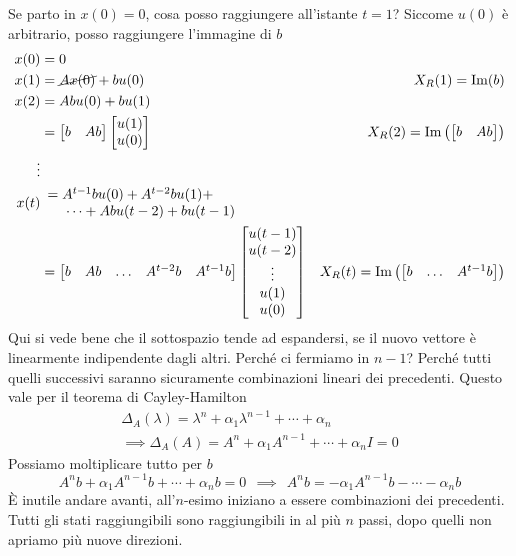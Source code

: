 Se parto in $x(0) =0$, cosa posso raggiungere all'istante $t=1$? Siccome $u(0)$ è arbitrario, posso raggiungere l'immagine di $b$
\begin{equation*}
	\begin{aligned}
		x(0) & =0 & \\
		x(1) & =\cancel{Ax(0)} +bu(0) & X_R(1) =\Im(b)\\
		x(2) & =Abu(0) +bu(1) & \\
		& =\begin{bmatrix}
		b & Ab
		\end{bmatrix}\begin{bmatrix}
		u(1)\\
		u(0)
		\end{bmatrix} & X_R(2) =\Im\left(\begin{bmatrix}
		b & Ab
		\end{bmatrix}\right)\\
		\vdots  &  & \\
		x(t) &  \begin{array}{l}
		=A^{t-1} bu(0) +A^{t-2} bu(1) +\\
		\ \ \ \ \cdots +Abu(t-2) +bu(t-1)
		\end{array} & \\
		& =\begin{bmatrix}
		b & Ab & \dotsc & A^{t-2} b & A^{t-1} b 
		\end{bmatrix}\begin{bmatrix}
		u(t-1)\\
		u(t-2)\\
		\vdots \\
		u(1)\\
		u(0)
		\end{bmatrix} & X_R(t) =\Im\left(\begin{bmatrix}
		b & \dotsc  & A^{t-1} b
		\end{bmatrix}\right)
	\end{aligned}
\end{equation*}
Qui si vede bene che il sottospazio tende ad espandersi, se il nuovo vettore è linearmente indipendente dagli altri. Perché ci fermiamo in $n-1$? Perché tutti quelli successivi saranno sicuramente combinazioni lineari dei precedenti. Questo vale per il teorema di Cayley-Hamilton
\begin{gather*}
	\Delta _A(\lambda) =\lambda ^n +\alpha _1 \lambda ^{n-1} +\cdots +\alpha _n\\
	\implies \Delta _A(A) =A^n +\alpha _1 A^{n-1} +\cdots +\alpha _n I=0
\end{gather*}
Possiamo moltiplicare tutto per $b$
\begin{equation*}
	A^n b+\alpha _1 A^{n-1} b+\cdots +\alpha _n b=0\ \ \implies \ \ A^n b=-\alpha _1 A^{n-1} b-\cdots -\alpha _n b
\end{equation*}
È inutile andare avanti, all'$n$-esimo iniziano a essere combinazioni dei precedenti. Tutti gli stati raggiungibili sono raggiungibili in al più $n$ passi, dopo quelli non apriamo più nuove direzioni.

